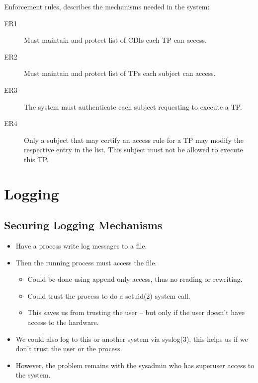 \documentclass{beamer}
\begin{document}
\begin{frame}{\insertsubsectionhead}
  Enforcement rules, describes the mechanisms needed in the system:
  \begin{description}
    \item[ER1] Must maintain and protect list of CDIs each TP can access.
    \item[ER2] Must maintain and protect list of TPs each subject can access.
    \item[ER3] The system must authenticate each subject requesting to execute 
      a TP\@.
    \item[ER4] Only a subject that may certify an access rule for a TP may 
      modify the respective entry in the list.
      This subject must not be allowed to execute this TP\@.
  \end{description}
\end{frame}


\section{Logging}

\subsection{Securing Logging Mechanisms}

\begin{frame}{\insertsubsectionhead}
  \begin{itemize}
    \item Have a process write log messages to a file.

    \item Then the running process must access the file.
      \begin{itemize}
        \item Could be done using append only access, thus no reading or 
          rewriting.

        \item Could trust the process to do a setuid(2) system call.

        \item This saves us from trusting the user -- but only if the user 
          doesn't have access to the hardware.

      \end{itemize}

    \item We could also log to this or another system via syslog(3), this helps 
      us if we don't trust the user or the process.

    \item However, the problem remains with the sysadmin who has superuser 
      access to the system.

  \end{itemize}
\end{frame}
\end{document}
